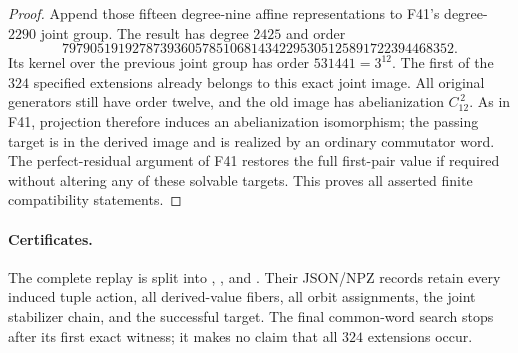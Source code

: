 \begin{proof}
Append those fifteen degree-nine affine representations
to F41's degree-$2290$ joint group. The result has degree
$2425$ and order
\[
79790519192787393605785106814342295305125891722394468352.
                                                        \tag{D23.F43.7}
\]
Its kernel over the previous joint group has order
$531441=3^{12}$. The first of the $324$ specified
extensions already belongs to this exact joint image.
All original generators still have order twelve, and the
old image has abelianization $C_{12}^{\,2}$. As in F41,
projection therefore induces an abelianization isomorphism;
the passing target is in the derived image and is realized
by an ordinary commutator word. The perfect-residual
argument of F41 restores the full first-pair value if
required without altering any of these solvable targets.
This proves all asserted finite compatibility statements.
\end{proof}

\paragraph{Certificates.}
The complete replay is split into
,
,
and .
Their JSON/NPZ records retain every induced tuple action,
all derived-value fibers, all orbit assignments, the joint
stabilizer chain, and the successful target. The final
common-word search stops after its first exact witness;
it makes no claim that all $324$ extensions occur.
